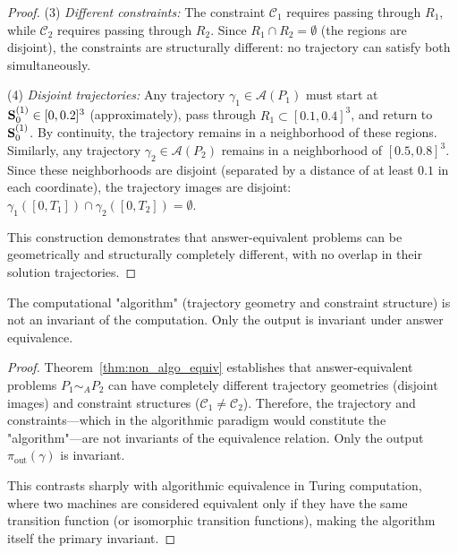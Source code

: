 \begin{proof}
(3) \textit{Different constraints:} The constraint $\mathcal{C}_1$ requires passing through $R_1$, while $\mathcal{C}_2$ requires passing through $R_2$. Since $R_1 \cap R_2 = \emptyset$ (the regions are disjoint), the constraints are structurally different: no trajectory can satisfy both simultaneously.

(4) \textit{Disjoint trajectories:} Any trajectory $\gamma_1 \in \mathcal{A}(P_1)$ must start at $\mathbf{S}_0^{(1)} \in [0, 0.2]^3$ (approximately), pass through $R_1 \subset [0.1, 0.4]^3$, and return to $\mathbf{S}_0^{(1)}$. By continuity, the trajectory remains in a neighborhood of these regions. Similarly, any trajectory $\gamma_2 \in \mathcal{A}(P_2)$ remains in a neighborhood of $[0.5, 0.8]^3$. Since these neighborhoods are disjoint (separated by a distance of at least $0.1$ in each coordinate), the trajectory images are disjoint: $\gamma_1([0,T_1]) \cap \gamma_2([0,T_2]) = \emptyset$.

This construction demonstrates that answer-equivalent problems can be geometrically and structurally completely different, with no overlap in their solution trajectories.
\end{proof}

\begin{corollary}
\label{cor:path_independence}
The computational "algorithm" (trajectory geometry and constraint structure) is not an invariant of the computation. Only the output is invariant under answer equivalence.
\end{corollary}

\begin{proof}
Theorem~\ref{thm:non_algo_equiv} establishes that answer-equivalent problems $P_1 \sim_A P_2$ can have completely different trajectory geometries (disjoint images) and constraint structures ($\mathcal{C}_1 \neq \mathcal{C}_2$). Therefore, the trajectory and constraints—which in the algorithmic paradigm would constitute the "algorithm"—are not invariants of the equivalence relation. Only the output $\pi_{\text{out}}(\gamma)$ is invariant.

This contrasts sharply with algorithmic equivalence in Turing computation, where two machines are considered equivalent only if they have the same transition function (or isomorphic transition functions), making the algorithm itself the primary invariant.
\end{proof}

